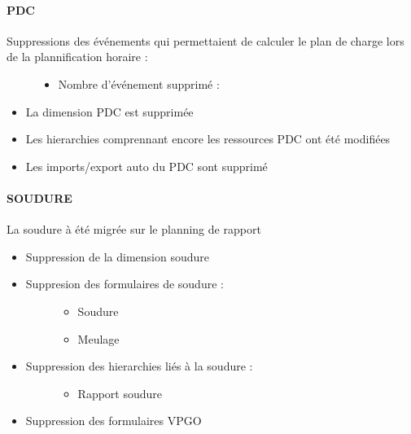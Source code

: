 \documentclass[letterpaper,10pt,english]{sphinxmanual}
\begin{document}
\paragraph{PDC}
\label{\detokenize{maj/maj_30092019:pdc}}\begin{description}
\item[{Suppressions des événements qui permettaient de calculer le plan de charge lors de la plannification horaire :}] \leavevmode\begin{itemize}
\item {} 
Nombre d’événement supprimé : 

\end{itemize}

\end{description}
\begin{itemize}
\item {} 
La dimension PDC est supprimée

\item {} 
Les hierarchies comprennant encore les ressources PDC ont été modifiées

\item {} 
Les imports/export auto du PDC sont supprimé

\end{itemize}


\paragraph{SOUDURE}
\label{\detokenize{maj/maj_30092019:soudure}}
La soudure à été migrée sur le planning de rapport
\begin{itemize}
\item {} 
Suppression de la dimension soudure

\item {} \begin{description}
\item[{Suppresion des formulaires de soudure :}] \leavevmode\begin{itemize}
\item {} 
Soudure

\item {} 
Meulage

\end{itemize}

\end{description}

\item {} \begin{description}
\item[{Suppression des hierarchies liés à la soudure :}] \leavevmode\begin{itemize}
\item {} 
Rapport soudure

\end{itemize}

\end{description}

\item {} 
Suppression des formulaires VPGO

\end{itemize}
\end{document}
